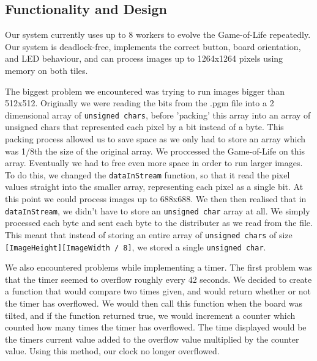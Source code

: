 \documentclass{article}
\begin{document}
\begin{multicols}{2}

\section{Functionality and Design}
Our system currently uses up to 8 workers to evolve the Game-of-Life repeatedly. Our system is
deadlock-free, implements the correct button, board orientation, and LED behaviour, and can process
images up to 1264x1264 pixels using memory on both tiles.

\vspace{3mm}

The biggest problem we encountered was trying to run images bigger than 512x512. Originally we were
reading the bits from the .pgm file into a 2 dimensional array of \texttt{unsigned chars}, before 'packing'
this array into an array of unsigned chars that represented each pixel by a bit instead of a byte.
This packing process allowed us to save space as we only had to store an array which was 1/8th the
size of the original array. We proccessed the Game-of-Life on this array. Eventually we had to
free even more space in order to run larger images. To do this, we changed the \texttt{dataInStream} function,
so that it read the pixel values straight into the smaller array, representing each pixel as a
single bit. At this point we could process images up to 688x688. We then then realised that in
\texttt{dataInStream}, we didn't have to store an \texttt{unsigned char} array at all. We simply processed
each byte and sent each byte to the distributer as we read from the file. This meant that instead
of storing an entire array of \texttt{unsigned chars} of size \texttt{[ImageHeight][ImageWidth / 8]}, we stored a single
\texttt{unsigned char}.

\vspace{3mm}

We also encountered problems while implementing a timer. The first problem was that the timer seemed
to overflow roughly every 42 seconds. We decided to create a function that would compare two times
given, and would return whether or not the timer has overflowed. We would then call this function when
the board was tilted, and if the function returned true, we would increment a counter which counted
how many times the timer has overflowed. The time displayed would be the timers current value added
to the overflow value multiplied by the counter value. Using this method, our clock no longer
overflowed.


\end{multicols}
\end{document}
